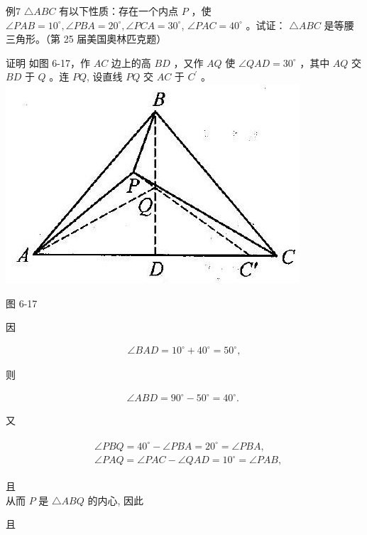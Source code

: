 \documentclass[10pt]{article}
\begin{document}
例7 $\triangle A B C$ 有以下性质：存在一个内点 $P$ ，使 $\angle P A B=10^{\circ}, \angle P B A=20^{\circ}, \angle P C A=30^{\circ}$, $\angle P A C=40^{\circ}$ 。试证： $\triangle A B C$ 是等腰三角形。（第 25 届美国奧林匹克题）

证明 如图 6-17，作 $A C$ 边上的高 $B D$ ，又作 $A Q$ 使 $\angle Q A D=30^{\circ}$ ，其中 $A Q$ 交 $B D$ 于 $Q$ 。连 $P Q$, 设直线 $P Q$ 交 $A C$ 于 $C^{\prime}$ 。\\
\includegraphics[max width=\textwidth, center]{2024_10_30_2c8f45efd4a519b08e1ag-068(1)}

图 6-17

因

\begin{align*}
\angle B A D=10^{\circ}+40^{\circ}=50^{\circ},
\end{align*}

则

\begin{align*}
\angle A B D=90^{\circ}-50^{\circ}=40^{\circ} \text {. }
\end{align*}

又

\begin{align*}
\begin{aligned}
& \angle P B Q=40^{\circ}-\angle P B A=20^{\circ}=\angle P B A, \\
& \angle P A Q=\angle P A C-\angle Q A D=10^{\circ}=\angle P A B,
\end{aligned}
\end{align*}

且\\
从而 $P$ 是 $\triangle A B Q$ 的内心, 因此

且
\end{document}
